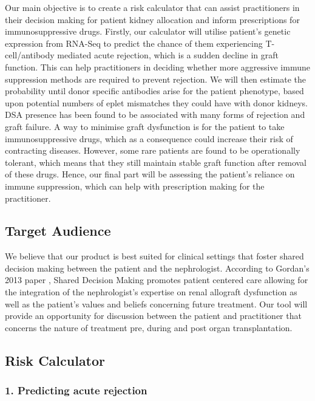 \documentclass[a4paper,9pt,twocolumn,twoside,]{pinp}
\begin{document}
Our main objective is to create a risk calculator that can assist
practitioners in their decision making for patient kidney allocation and
inform prescriptions for immunosuppressive drugs. Firstly, our
calculator will utilise patient's genetic expression from RNA-Seq to
predict the chance of them experiencing T-cell/antibody mediated acute
rejection, which is a sudden decline in graft function. This can help
practitioners in deciding whether more aggressive immune suppression
methods are required to prevent rejection. We will then estimate the
probability until donor specific antibodies arise for the patient
phenotype, based upon potential numbers of eplet mismatches they could
have with donor kidneys. DSA presence has been found to be associated
with many forms of rejection and graft failure. A way to minimise graft
dysfunction is for the patient to take immunosuppressive drugs, which as
a consequence could increase their risk of contracting diseases.
However, some rare patients are found to be operationally tolerant,
which means that they still maintain stable graft function after removal
of these drugs. Hence, our final part will be assessing the patient's
reliance on immune suppression, which can help with prescription making
for the practitioner.

\hypertarget{target-audience}{%
\subsection{Target Audience}\label{target-audience}}

We believe that our product is best suited for clinical settings that
foster shared decision making between the patient and the nephrologist.
According to Gordan's 2013 paper , Shared Decision Making promotes
patient centered care allowing for the integration of the nephrologist's
expertise on renal allograft dysfunction as well as the patient's values
and beliefs concerning future treatment. Our tool will provide an
opportunity for discussion between the patient and practitioner that
concerns the nature of treatment pre, during and post organ
transplantation.

\hypertarget{risk-calculator}{%
\subsection{Risk Calculator}\label{risk-calculator}}

\hypertarget{predicting-acute-rejection}{%
\subsubsection{1. Predicting acute
rejection}\label{predicting-acute-rejection}}
\end{document}
